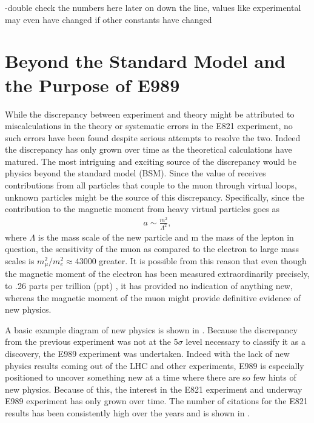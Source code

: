 -double check the numbers here later on down the line, values like \amu experimental may even have changed if other constants have changed




\section{Beyond the Standard Model and the Purpose of E989}
\label{sec:BSM}


While the discrepancy between experiment and theory might be attributed to miscalculations in the theory or systematic errors in the E821 experiment, no such errors have been found despite serious attempts to resolve the two. Indeed the discrepancy has only grown over time as the theoretical calculations have matured. The most intriguing and exciting source of the discrepancy would be physics beyond the standard model (BSM). Since the value of \amu receives contributions from all particles that couple to the muon through virtual loops, unknown particles might be the source of this discrepancy. Specifically, since the contribution to the magnetic moment from heavy virtual particles goes as 
		\begin{align}
            a \sim \frac{m^{2}}{\Lambda^{2}},
		\end{align}
where $\Lambda$ is the mass scale of the new particle and m the mass of the lepton in question, the sensitivity of the muon as compared to the electron to large mass scales is $ m_{\mu}^{2} / m_{e}^{2} \approx 43000$ greater. It is possible from this reason that even though the magnetic moment of the electron has been measured extraordinarily precisely, to .26 parts per trillion (ppt) \cite{ElectronMDM,CODATA}, it has provided no indication of anything new, whereas the magnetic moment of the muon might provide definitive evidence of new physics.

A basic example diagram of new physics is shown in . Because the discrepancy from the previous experiment was not at the 5$\sigma$ level necessary to classify it as a discovery, the E989 experiment was undertaken. Indeed with the lack of new physics results coming out of the LHC and other experiments, E989 is especially positioned to uncover something new at a time where there are so few hints of new physics. Because of this, the interest in the E821 experiment and underway E989 experiment has only grown over time. The number of citations for the E821 results has been consistently high over the years and is shown in .

